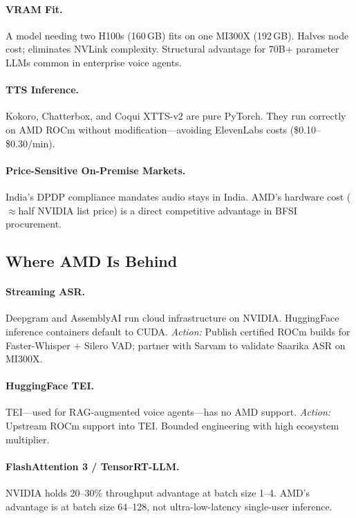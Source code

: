 \documentclass[12pt,a4paper]{article}
\begin{document}
\paragraph{VRAM Fit.}
A model needing two H100s (160\,GB) fits on one MI300X (192\,GB).  Halves
node cost; eliminates NVLink complexity.  Structural advantage for
70B+ parameter LLMs common in enterprise voice agents.

\paragraph{TTS Inference.}
Kokoro, Chatterbox, and Coqui XTTS-v2 are pure PyTorch.  They run
correctly on AMD ROCm without modification---avoiding ElevenLabs costs
(\$0.10--\$0.30/min).

\paragraph{Price-Sensitive On-Premise Markets.}
India's DPDP compliance mandates audio stays in India.  AMD's hardware cost
($\approx$half NVIDIA list price) is a direct competitive advantage in
BFSI procurement.

\subsection{Where AMD Is Behind}

\paragraph{Streaming ASR.}
Deepgram and AssemblyAI run cloud infrastructure on NVIDIA.  HuggingFace
inference containers default to CUDA.  \textit{Action:} Publish certified
ROCm builds for Faster-Whisper + Silero VAD; partner with Sarvam to
validate Saarika ASR on MI300X.

\paragraph{HuggingFace TEI.}
TEI---used for RAG-augmented voice agents---has no AMD support.
\textit{Action:} Upstream ROCm support into TEI.  Bounded engineering
with high ecosystem multiplier.

\paragraph{FlashAttention 3 / TensorRT-LLM.}
NVIDIA holds 20--30\% throughput advantage at batch size 1--4.  AMD's
advantage is at batch size 64--128, not ultra-low-latency single-user
inference.
\end{document}
